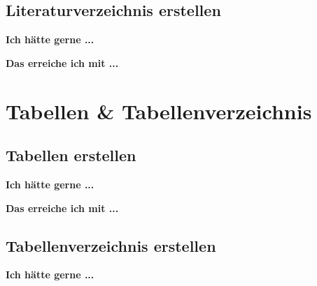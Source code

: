 \documentclass[twoside, 
               a4paper, 
               10pt, 
               parskip=full, 
               sectionentrydots=true, 
               listof=totoc, 
               listof=entryprefix,
               numbers=endperiod]{scrartcl}
\begin{document}
\newpage
\subsection{Literaturverzeichnis erstellen}
{\textbf {Ich hätte gerne ...}}
 
\begin{miniSeite}[colbacktitle=black!35!white,title=Ausdruck]

\end{miniSeite}


\newpage
{\textbf {Das erreiche ich mit ...}}
 
\begin{miniSeite}[colbacktitle=black!35!white,title=\LaTeX-Code]

\end{miniSeite}





\newpage
\section{Tabellen \& Tabellenverzeichnis}
\subsection{Tabellen erstellen}

{\textbf {Ich hätte gerne ...}}
 



\newpage
{\textbf {Das erreiche ich mit ...}}
 
\begin{miniSeite}[colbacktitle=black!35!white,title=\LaTeX-Code]

\end{miniSeite}




\newpage
\subsection{Tabellenverzeichnis erstellen}
{\textbf {Ich hätte gerne ...}}
 
\begin{miniSeite}[colbacktitle=black!35!white,title=Ausdruck]

\end{miniSeite}

\end{document}
